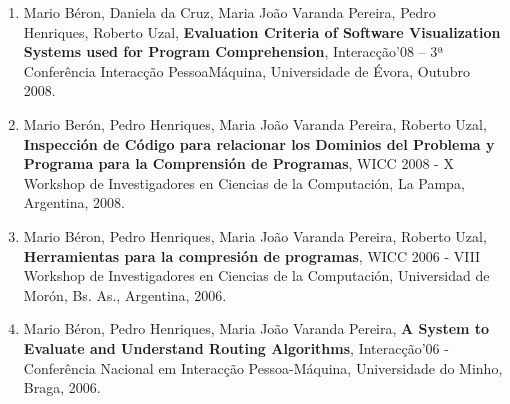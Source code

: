 \documentclass[11pt]{article}
\begin{document}
\begin{enumerate}
\item {Mario Béron, Daniela da Cruz, Maria João Varanda Pereira, Pedro Henriques, Roberto Uzal, {\bf{ Evaluation Criteria of Software Visualization Systems used for Program Comprehension}}, Interacção'08 -- 3ª Conferência Interacção Pessoa\-Máquina, Universidade de Évora, Outubro 2008.}

\item {Mario Berón, Pedro Henriques, Maria João Varanda Pereira, Roberto Uzal, {\bf{ Inspección de Código para relacionar los Dominios del Problema y Programa para la Comprensión de Programas}}, WICC 2008 - X Workshop de Investigadores en Ciencias de la Computación, La Pampa, Argentina, 2008. }

\item {Mario Béron, Pedro Henriques, Maria João Varanda Pereira, Roberto Uzal, {\bf{ Herramientas para la compresión de programas}}, WICC 2006 - VIII Workshop de Investigadores en Ciencias de la Computación, Universidad de Morón, Bs. As., Argentina, 2006. }

\item {Mario Béron, Pedro Henriques, Maria João Varanda Pereira, {\bf{ A System to Evaluate and Understand Routing Algorithms}}, Interacção'06 - Conferência Nacional em Interacção Pessoa-Máquina, Universidade do Minho, Braga, 2006. }


\end{enumerate}
\end{document}

